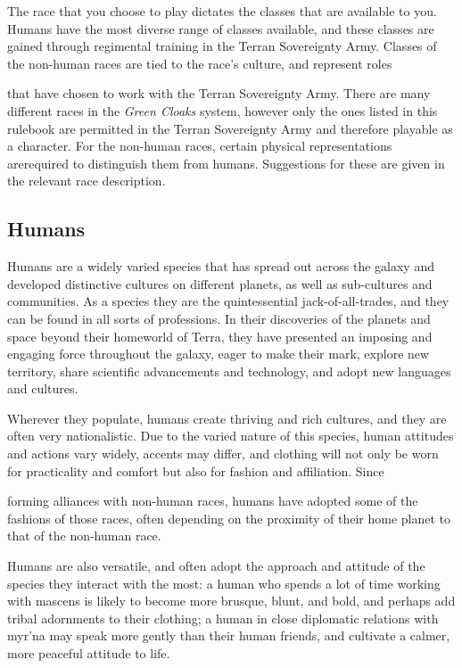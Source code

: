 \documentclass{scrbook}
\begin{document}
The race that you choose to play dictates the classes that are available to you. Humans have the most diverse range of classes available, and these classes are gained through regimental training in the Terran Sovereignty Army. Classes of the non-human races are tied to the race's culture, and represent roles

that have chosen to work with the Terran Sovereignty Army. There are many different races in the \textit{Green Cloaks} system, however only the ones listed in this rulebook are permitted in the Terran Sovereignty Army and therefore playable as a character. For the non-human races, certain physical representations arerequired to distinguish them from humans. Suggestions for these are given in the relevant race description.

\subsection{Humans}

Humans are a widely varied species that has spread out across the galaxy and developed distinctive cultures on different planets, as well as sub-cultures and communities. As a species they are the quintessential jack-of-all-trades, and they can be found in all sorts of professions. In their discoveries of the planets and space beyond their homeworld of Terra, they have presented an imposing and engaging force throughout the galaxy, eager to make their mark, explore new territory, share scientific advancements and technology, and adopt new languages and cultures.

Wherever they populate, humans create thriving and rich cultures, and they are often very nationalistic. Due to the varied nature of this species, human attitudes and actions vary widely, accents may differ, and clothing will not only be worn for practicality and comfort but also for fashion and affiliation. Since

forming alliances with non-human races, humans have adopted some of the fashions of those races, often depending on the proximity of their home planet to that of the non-human race.

Humans are also versatile, and often adopt the approach and attitude of the species they interact with the most: a human who spends a lot of time working with mascens is likely to become more brusque, blunt, and bold, and perhaps add tribal adornments to their clothing; a human in close diplomatic relations with myr'na may speak more gently than their human friends, and cultivate a calmer, more peaceful attitude to life.
\end{document}
